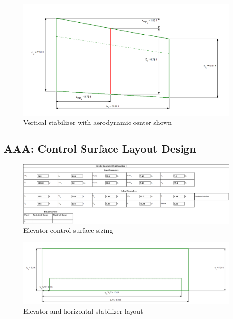 \documentclass[conf]{new-aiaa}
\begin{document}
\begin{figure}[H]
    \includegraphics[width=\textwidth]{Report3Printouts/Empannage/Vertical_volumeratio_plot.png}
    \caption{Vertical stabilizer with aerodynamic center shown}
    \label{fig:vertical_volumeratio_plot}
\end{figure}

\subsection{AAA: Control Surface Layout Design}
\begin{figure}[H]
    \includegraphics[width=\textwidth]{Report3Printouts/Empannage/Horizontal_elevator_cropped.png}
    \caption{Elevator control surface sizing}
    \label{fig:horizontal_elevator}
\end{figure}

\begin{figure}[H]
    \includegraphics[width=\textwidth]{Report3Printouts/Empannage/Horizontal_elevator_plot.png}
    \caption{Elevator and horizontal stabilizer layout}
    \label{fig:horizontal_elevator_plot}
\end{figure}
\end{document}
